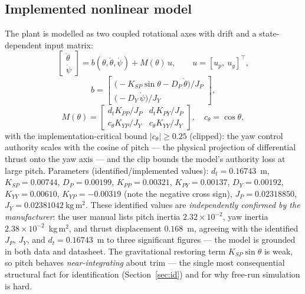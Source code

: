 \documentclass[conference]{IEEEtran}
\begin{document}
\subsection{Implemented nonlinear model}
The plant is modelled as two coupled rotational axes with drift and a state-dependent input matrix:
\begin{equation}
\begin{bmatrix}\ddot\theta\\ \ddot\psi\end{bmatrix}
= b(\theta,\dot\theta,\dot\psi) + M(\theta)\,u,
\qquad u = [u_p,\ u_y]^{\!\top},
\label{eq:aero_nl}
\end{equation}
\begin{equation}
b = \begin{bmatrix}
\bigl(-K_{SP}\sin\theta - D_P\,\dot\theta\bigr)/J_P\\[2pt]
\bigl(-D_Y\,\dot\psi\bigr)/J_Y
\end{bmatrix},
\end{equation}
\begin{equation}
M(\theta) = \begin{bmatrix}
d_t K_{PP}/J_P & d_t K_{PY}/J_P\\[2pt]
c_\theta K_{YP}/J_Y & c_\theta K_{YY}/J_Y
\end{bmatrix},
\quad c_\theta = \cos\theta,
\label{eq:Mtheta}
\end{equation}
with the implementation-critical bound $|c_\theta| \ge 0.25$ (clipped): the yaw control authority scales with the cosine of pitch --- the physical projection of differential thrust onto the yaw axis --- and the clip bounds the model's authority loss at large pitch. Parameters (identified/implemented values):
$d_t = 0.16743$~m, $K_{SP}=0.00744$, $D_P=0.00199$, $K_{PP}=0.00321$, $K_{PY}=0.00137$, $D_Y=0.00192$, $K_{YY}=0.00610$, $K_{YP}=-0.00319$ (note the negative cross sign),
$J_P = 0.02318850$, $J_Y = 0.02381042\ \mathrm{kg\,m^2}$.
These identified values are \emph{independently confirmed by the manufacturer}: the user manual lists pitch inertia $2.32\times10^{-2}$, yaw inertia $2.38\times10^{-2}$~kg\,m$^2$, and thrust displacement $0.168$~m, agreeing with the identified $J_P$, $J_Y$, and $d_t = 0.16743$~m to three significant figures --- the model is grounded in both data and datasheet. The gravitational restoring term $K_{SP}\sin\theta$ is weak, so pitch behaves \emph{near-integrating} about trim --- the single most consequential structural fact for identification (Section~\ref{sec:id}) and for why free-run simulation is hard.
\end{document}
